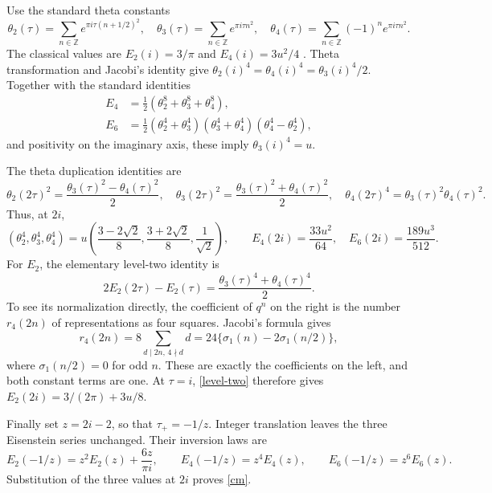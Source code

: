 \documentclass[11pt]{article}
\begin{document}
Use the standard theta constants
\[
 \theta_2(\tau)=\sum_{n\in\mathbb Z}e^{\pi i\tau(n+1/2)^2},\quad
 \theta_3(\tau)=\sum_{n\in\mathbb Z}e^{\pi i\tau n^2},\quad
 \theta_4(\tau)=\sum_{n\in\mathbb Z}(-1)^ne^{\pi i\tau n^2}.
\]
The classical values are $E_2(i)=3/\pi$ and $E_4(i)=3u^2/4$
\cite[p.~85]{Z}. Theta transformation and Jacobi's identity give
$\theta_2(i)^4=\theta_4(i)^4=\theta_3(i)^4/2$.
Together with the standard identities \cite[pp.~28--29]{Z}
\begin{align*}
 E_4&=\tfrac12(\theta_2^8+\theta_3^8+\theta_4^8),\\
 E_6&=\tfrac12(\theta_2^4+\theta_3^4)
                 (\theta_3^4+\theta_4^4)(\theta_4^4-\theta_2^4),
\end{align*}
and positivity on the imaginary axis, these imply
$\theta_3(i)^4=u$.

The theta duplication identities \cite[Section 20.7]{DLMF} are
\[
 \theta_2(2\tau)^2=\frac{\theta_3(\tau)^2-\theta_4(\tau)^2}{2},
 \quad
 \theta_3(2\tau)^2=\frac{\theta_3(\tau)^2+\theta_4(\tau)^2}{2},
 \quad
 \theta_4(2\tau)^4=\theta_3(\tau)^2\theta_4(\tau)^2.
\]
Thus, at $2i$,
\[
 (\theta_2^4,\theta_3^4,\theta_4^4)
  =u\left(\frac{3-2\sqrt2}{8},\frac{3+2\sqrt2}{8},
                                  \frac1{\sqrt2}\right),
 \qquad
 E_4(2i)=\frac{33u^2}{64},\quad E_6(2i)=\frac{189u^3}{512}.
\]
For $E_2$, the elementary level-two identity is
\begin{equation}\label{level-two}
 2E_2(2\tau)-E_2(\tau)
                    =\frac{\theta_3(\tau)^4+\theta_4(\tau)^4}{2}.
\end{equation}
To see its normalization directly, the coefficient of $q^n$ on the
right is the number $r_4(2n)$ of representations as four squares.
Jacobi's formula \cite[Proposition 11]{Z} gives
\[
 r_4(2n)=8\sum_{d\mid2n,\,4\nmid d}d
       =24\{\sigma_1(n)-2\sigma_1(n/2)\},
\]
where $\sigma_1(n/2)=0$ for odd $n$. These are exactly the
coefficients on the left, and both constant terms are one.
At $\tau=i$, \eqref{level-two} therefore gives
$E_2(2i)=3/(2\pi)+3u/8$.

Finally set $z=2i-2$, so that $\tau_+=-1/z$.
Integer translation leaves the three Eisenstein series unchanged.
Their inversion laws are
\[
 E_2(-1/z)=z^2E_2(z)+\frac{6z}{\pi i},\qquad
 E_4(-1/z)=z^4E_4(z),\qquad E_6(-1/z)=z^6E_6(z).
\]
Substitution of the three values at $2i$ proves \eqref{cm}.
\end{document}
